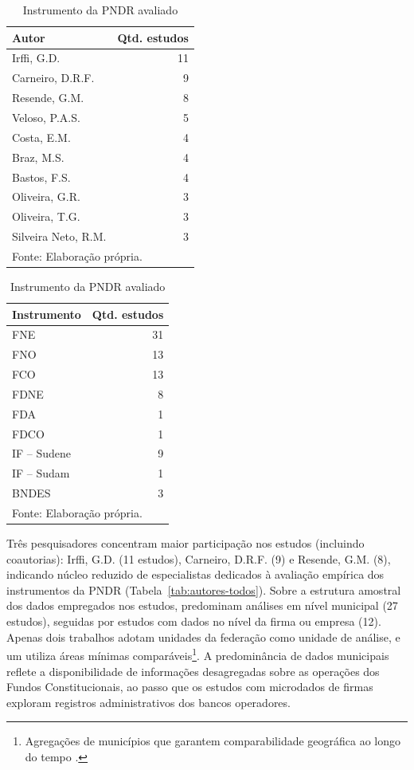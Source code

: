 \begin{table}[H]
\footnotesize
\renewcommand{\arraystretch}{1.2}
\centering
\begin{minipage}[t]{0.38\textwidth}
\caption{Top-10 autores (autorias e coautorias)}
\label{tab:autores-todos}
\begin{tabular}{lr}
\toprule
Autor & Qtd. estudos \\
\midrule
Irffi, G.D. & 11 \\
Carneiro, D.R.F. & 9 \\
Resende, G.M. & 8 \\
Veloso, P.A.S. & 5 \\
Costa, E.M. & 4 \\
Braz, M.S. & 4 \\
Bastos, F.S. & 4 \\
Oliveira, G.R. & 3 \\
Oliveira, T.G. & 3 \\
Silveira Neto, R.M. & 3 \\
\bottomrule
\multicolumn{2}{l}{\footnotesize Fonte: Elaboração própria.} \\
\end{tabular}
\end{minipage}
\hfill
\begin{minipage}[t]{0.58\textwidth}
\centering
\caption{Instrumento da PNDR avaliado}
\label{tab:instrumentos}
\begin{tabular}{lr}
\toprule
Instrumento & Qtd. estudos \\
\midrule
FNE & 31 \\
FNO & 13 \\
FCO & 13 \\
FDNE & 8 \\
FDA & 1 \\
FDCO & 1 \\
IF -- Sudene & 9 \\
IF -- Sudam & 1 \\
BNDES & 3 \\
\bottomrule
\multicolumn{2}{l}{\footnotesize Fonte: Elaboração própria.} \\
\end{tabular}
\end{minipage}
\end{table}

Três pesquisadores concentram maior participação nos estudos (incluindo coautorias): Irffi, G.D. (11 estudos), Carneiro, D.R.F. (9) e Resende, G.M. (8), indicando núcleo reduzido de especialistas dedicados à avaliação empírica dos instrumentos da PNDR (Tabela~\ref{tab:autores-todos}). Sobre a estrutura amostral dos dados empregados nos estudos, predominam análises em nível municipal (27 estudos), seguidas por estudos com dados no nível da firma ou empresa (12). Apenas dois trabalhos adotam unidades da federação como unidade de análise, e um utiliza áreas mínimas comparáveis\footnote{Agregações de municípios que garantem comparabilidade geográfica ao longo do tempo \cite{OliveiraResende2017b}.}. A predominância de dados municipais reflete a disponibilidade de informações desagregadas sobre as operações dos Fundos Constitucionais, ao passo que os estudos com microdados de firmas exploram registros administrativos dos bancos operadores.

